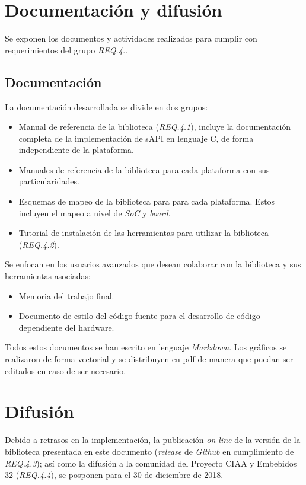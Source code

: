 \section{Documentación y difusión}
\label{sec:documentation}

Se exponen los documentos y actividades realizados para cumplir con requerimientos del grupo \emph{REQ.4.}.

\subsection{Documentación}

La documentación desarrollada se divide en dos grupos:


\begin{itemize}
\item
Manual de referencia de la biblioteca (\emph{REQ.4.1}), incluye la documentación completa de la implementación de sAPI en lenguaje C, de forma independiente de la plataforma.
\item
Manuales de referencia de la biblioteca para cada plataforma con sus particularidades.
\item
Esquemas de mapeo de la biblioteca para para cada plataforma. Estos incluyen el mapeo a nivel de \emph{SoC} y \emph{board}.
\item
Tutorial de instalación de las herramientas para utilizar la biblioteca (\emph{REQ.4.2}).
\end{itemize}


Se enfocan en los usuarios avanzados que desean colaborar con la biblioteca y sus herramientas asociadas:

\begin{itemize}
\item
Memoria del trabajo final.
\item
Documento de estilo del código fuente para el desarrollo de código dependiente del hardware.
\end{itemize}

Todos estos documentos se han escrito en lenguaje \emph{Markdown}. Los gráficos se realizaron de forma vectorial y se distribuyen en pdf de manera que puedan ser editados en caso de ser necesario. 

\section{Difusión}

Debido a retrasos en la implementación, la publicación \emph{on line} de la versión de la biblioteca presentada en este documento (\emph{release} de \emph{Github} en cumplimiento de \emph{REQ.4.3}); así como la difusión a la comunidad del Proyecto CIAA y Embebidos 32 (\emph{REQ.4.4}), se posponen para el 30 de diciembre de 2018.
